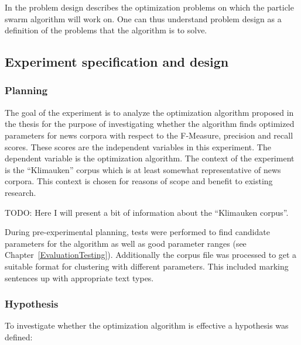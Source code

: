In  the problem design describes the optimization problems on which the particle swarm algorithm will work on. One can thus understand problem design as a definition of the problems that the algorithm is to solve.

\subsection{Experiment specification and design}

\subsubsection{Planning}
The goal of the experiment is to analyze the optimization algorithm proposed in the thesis for the purpose of investigating whether the algorithm finds optimized parameters for news corpora  with respect to the F-Measure, precision and recall scores. These scores are the independent variables in this experiment. The dependent variable is the optimization algorithm. The context of the experiment is the ``Klimauken'' corpus which is at least somewhat representative of news corpora. This context is chosen for reasons of scope and benefit to existing research.

TODO: Here I will present a bit of information about the ``Klimauken corpus''.

During pre-experimental planning, tests were performed to find candidate parameters for the algorithm as well as good parameter ranges (see Chapter~\ref{EvaluationTesting}). Additionally the corpus file was processed to get a suitable format for clustering with different parameters. This included marking sentences up with appropriate text types.

\subsubsection{Hypothesis}

To investigate whether the optimization algorithm is effective a hypothesis was defined:

